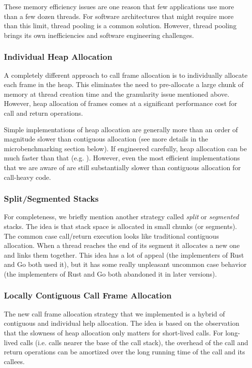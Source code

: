 \documentclass[10pt,preprint]{sigplanconf}
\begin{document}
These memory efficiency issues are one reason that few applications use more than a few dozen threads.
For software architectures that might require more than this limit, thread pooling is a common solution.
However, thread pooling brings its own inefficiencies and software engineering challenges.

\subsubsection{Individual Heap Allocation}

A completely different approach to call frame allocation is to individually allocate each frame in the heap.
This eliminates the need to pre-allocate a large chunk of memory at thread creation time and the granularity issue mentioned above.
However, heap allocation of frames comes at a significant performance cost for call and return operations.

Simple implementations of heap allocation are generally more than an order of magnitude slower than contiguous allocation (see more details in the microbenchmarking section below).
If engineered carefully, heap allocation can be much faster than that (e.g. \cite{Shao2000}).
However, even the most efficient implementations that we are aware of are still substantially slower than contiguous allocation for call-heavy code.

\subsubsection{Split/Segmented Stacks}

For completeness, we briefly mention another strategy called \emph{split} or \emph{segmented} stacks.
The idea is that stack space is allocated in small chunks (or segments).
The common case call/return execution looks like traditional contiguous allocation.
When a thread reaches the end of its segment it allocates a new one and links them together.
This idea has a lot of appeal (the implementers of Rust and Go both used it), but it has some really unpleasant uncommon case behavior (the implementers of Rust and Go both
abandoned it in later versions).

\subsubsection{Locally Contiguous Call Frame Allocation}

The new call frame allocation strategy that we implemented is a hybrid of contiguous and individual help allocation.
The idea is based on the observation that the slowness of heap allocation only matters for short-lived calls.
For long-lived calls (i.e. calls nearer the base of the call stack), the overhead of the call and return operations can be amortized over the long running time of the call and its callees.
\end{document}
